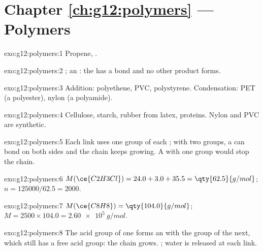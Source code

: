 \section*{Chapter \ref{ch:g12:polymers} --- Polymers}

\begin{solution}{exo:g12:polymers:1}
Propene, .
\end{solution}

\begin{solution}{exo:g12:polymers:2}
; an : the  has a  bond and
no other product forms.
\end{solution}

\begin{solution}{exo:g12:polymers:3}
Addition: polyethene, PVC, polystyrene. Condensation: PET (a polyester),
nylon (a polyamide).
\end{solution}

\begin{solution}{exo:g12:polymers:4}
Cellulose, starch, rubber from latex, proteins. Nylon and PVC are
synthetic.
\end{solution}

\begin{solution}{exo:g12:polymers:5}
Each link uses one group of each ; with two groups, a 
can bond on both sides and the chain keeps growing. A  with one
group would stop the chain.
\end{solution}

\begin{solution}{exo:g12:polymers:6}
$M(\ce{C2H3Cl}) = 24.0 + 3.0 + 35.5 = \qty{62.5}{g/mol}$;
$n = 125000/62.5 = 2000$.
\end{solution}

\begin{solution}{exo:g12:polymers:7}
$M(\ce{C8H8}) = \qty{104.0}{g/mol}$; $M = 2500 \times 104.0 =
\qty{2.60e5}{g/mol}$.
\end{solution}

\begin{solution}{exo:g12:polymers:8}
The acid group of one  forms an  with the  group of
the next, which still has a free acid group: the chain grows.  ; water is released at each link.
\end{solution}

